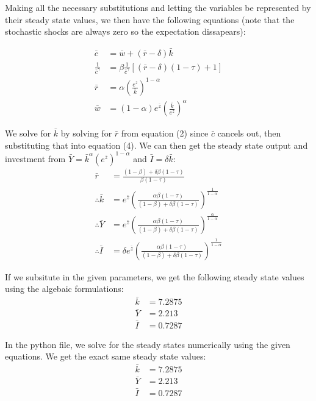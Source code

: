\documentclass[letterpaper,11pt]{article}
\theoremstyle{definition}
\begin{document}
\begin{spacing}{1.5}
\begin{Exercise}
		Making all the necessary substitutions and letting the variables be represented by their steady state values, we then have the following equations (note that the stochastic shocks are always zero so the expectation dissapears):

		\begin{align}
			\bar{c} &= \bar{w}+(\bar{r}-\delta)\bar{k} \\
			\frac{1}{\bar{c}^\gamma} &=  \beta \frac{1}{\bar{c}^\gamma}[(\bar{r}-\delta)(1-\tau)+1]\\
			\bar{r}&= \alpha (\frac{ e^{\bar{z}}}{\bar{k}})^{1-\alpha}\\
			\bar{w}&= (1-\alpha)e^{\bar{z}} (\frac{\bar{k}}{ e^{\bar{z}}})^{\alpha}
		\end{align}

		We solve for $\bar{k}$ by solving for $\bar{r}$ from equation (2) since $\bar{c}$ cancels out, then substituting that into equation (4). We can then get the steady state output and investment from $\bar{Y} = \bar{k}^\alpha (e^{\bar{z}})^{1-\alpha}$ and $\bar{I}=\delta\bar{k}$:
		\begin{align*}
			\bar{r} &= \frac{(1-\beta)+\delta\beta(1-\tau)}{\beta(1-\tau)} \\
			\therefore \bar{k} &= e^{\bar{z}}(\frac{\alpha\beta(1-\tau)}{(1-\beta)+\delta\beta(1-\tau)})^{\frac{1}{1-\alpha}} \\
			\therefore \bar{Y} &=e^{\bar{z}}(\frac{\alpha\beta(1-\tau)}{(1-\beta)+\delta\beta(1-\tau)})^{\frac{\alpha}{1-\alpha}} \\
			\therefore \bar{I} &= \delta e^{\bar{z}}(\frac{\alpha\beta(1-\tau)}{(1-\beta)+\delta\beta(1-\tau)})^{\frac{1}{1-\alpha}}
		\end{align*}

		If we subsitute in the given parameters, we get the following steady state values using the algebaic formulations:
		\begin{align*}
			\bar{k} &= 7.2875 \\
			\bar{Y} &= 2.213\\
			\bar{I} &= 0.7287
		\end{align*}

		In the python file, we solve for the steady states numerically using the given equations. We get the exact same steady state values:
		\begin{align*}
			\bar{k} &= 7.2875 \\
			\bar{Y} &= 2.213\\
			\bar{I} &= 0.7287
		\end{align*}
	\end{Exercise}


\end{spacing}
\end{document}

